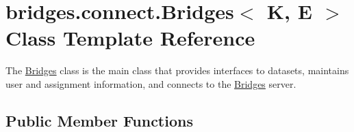 \hypertarget{classbridges_1_1connect_1_1_bridges}{}\section{bridges.\+connect.\+Bridges$<$ K, E $>$ Class Template Reference}
\label{classbridges_1_1connect_1_1_bridges}


The \hyperlink{classbridges_1_1connect_1_1_bridges}{Bridges} class is the main class that provides interfaces to datasets, maintains user and assignment information, and connects to the \hyperlink{classbridges_1_1connect_1_1_bridges}{Bridges} server.  


\subsection*{Public Member Functions}
